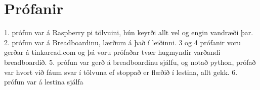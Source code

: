 \section{Prófanir}
1. prófun var á Raspberry pi tölvuini, hún keyrði allt vel og engin vandræði þar. 2. prófun var á Breadboardinu, lærðum á það í leiðinni. 3 og 4 prófanir voru gerðar á tinkarcad.com og þá voru prófaðar tvær hugmyndir varðandi breadboardið. 5. prófun var gerð á breadboardinu sjálfu, og notað python, prófað var hvort við fáum svar í tölvuna ef stoppað er flæðið í lestina, allt gekk. 6. prófun var á lestina sjálfa
